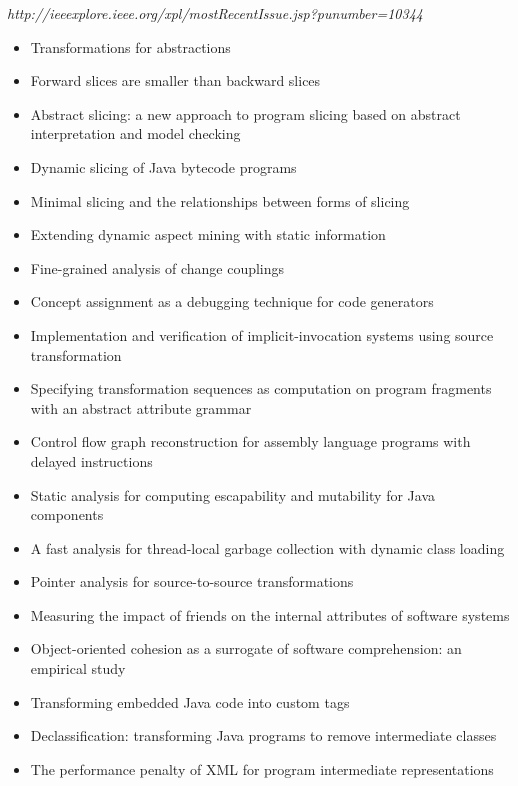 {\small \em http://ieeexplore.ieee.org/xpl/mostRecentIssue.jsp?punumber=10344}

{\small
\begin{itemize}[itemsep=-1ex]
  \item Transformations for abstractions
  \item Forward slices are smaller than backward slices
  \item Abstract slicing: a new approach to program slicing based on abstract interpretation and model checking {\color{blue} \checkmark}{\color{red} \texttimes}
  \item Dynamic slicing of Java bytecode programs {\color{blue} \checkmark}{\color{red} \texttimes}
  \item Minimal slicing and the relationships between forms of slicing
  \item Extending dynamic aspect mining with static information
  \item Fine-grained analysis of change couplings
  \item Concept assignment as a debugging technique for code generators
  \item Implementation and verification of implicit-invocation systems using source transformation {\color{blue} \checkmark}{\color{red} \texttimes}
  \item Specifying transformation sequences as computation on program fragments with an abstract attribute grammar {\color{blue} \checkmark}{\color{red} \texttimes}
  \item Control flow graph reconstruction for assembly language programs with delayed instructions
  \item Static analysis for computing escapability and mutability for Java components
  \item A fast analysis for thread-local garbage collection with dynamic class loading
  \item Pointer analysis for source-to-source transformations {\color{blue} \checkmark}{\color{red} \texttimes}
  \item Measuring the impact of friends on the internal attributes of software systems
  \item Object-oriented cohesion as a surrogate of software comprehension: an empirical study
  \item Transforming embedded Java code into custom tags {\color{blue} \checkmark}{\color{red} \texttimes}
  \item Declassification: transforming Java programs to remove intermediate classes
  \item The performance penalty of XML for program intermediate representations {\color{blue} \checkmark}{\color{red} \texttimes}
\end{itemize}
}

